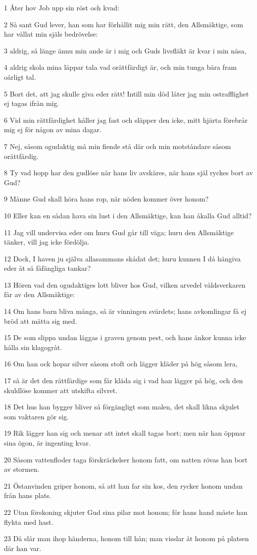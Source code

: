 \par 1 Åter hov Job upp sin röst och kvad:
\par 2 Så sant Gud lever, han som har förhållit mig min rätt, den Allsmäktige, som har vållat min själs bedrövelse:
\par 3 aldrig, så länge ännu min ande är i mig och Guds livsfläkt är kvar i min näsa,
\par 4 aldrig skola mina läppar tala vad orättfärdigt är, och min tunga bära fram oärligt tal.
\par 5 Bort det, att jag skulle giva eder rätt! Intill min död låter jag min ostrafflighet ej tagas ifrån mig.
\par 6 Vid min rättfärdighet håller jag fast och släpper den icke, mitt hjärta förebrår mig ej för någon av mina dagar.
\par 7 Nej, såsom ogudaktig må min fiende stå där och min motståndare såsom orättfärdig.
\par 8 Ty vad hopp har den gudlöse när hans liv avskäres, när hans själ ryckes bort av Gud?
\par 9 Månne Gud skall höra hans rop, när nöden kommer över honom?
\par 10 Eller kan en sådan hava sin lust i den Allsmäktige, kan han åkalla Gud alltid?
\par 11 Jag vill undervisa eder om huru Gud går till väga; huru den Allsmäktige tänker, vill jag icke fördölja.
\par 12 Dock, I haven ju själva allasammans skådat det; huru kunnen I då hängiva eder åt så fåfängliga tankar?
\par 13 Hören vad den ogudaktiges lott bliver hos Gud, vilken arvedel våldsverkaren får av den Allsmäktige:
\par 14 Om hans barn bliva många, så är vinningen svärdets; hans avkomlingar få ej bröd att mätta sig med.
\par 15 De som slippa undan läggas i graven genom pest, och hans änkor kunna icke hålla sin klagogråt.
\par 16 Om han ock hopar silver såsom stoft och lägger kläder på hög såsom lera,
\par 17 så är det den rättfärdige som får kläda sig i vad han lägger på hög, och den skuldlöse kommer att utskifta silvret.
\par 18 Det hus han bygger bliver så förgängligt som malen, det skall likna skjulet som vaktaren gör sig.
\par 19 Rik lägger han sig och menar att intet skall tagas bort; men när han öppnar sina ögon, är ingenting kvar.
\par 20 Såsom vattenfloder taga förskräckelser honom fatt, om natten rövas han bort av stormen.
\par 21 Östanvinden griper honom, så att han far sin kos, den rycker honom undan från hans plats.
\par 22 Utan förskoning skjuter Gud sina pilar mot honom; för hans hand måste han flykta med hast.
\par 23 Då slår man ihop händerna, honom till hån; man visslar åt honom på platsen där han var.

